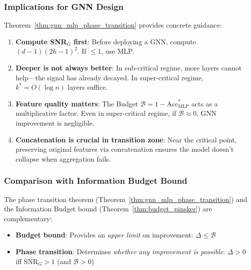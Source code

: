 \subsubsection{Implications for GNN Design}

\begin{remark}
\label{rem:practical_implications}
Theorem~\ref{thm:gnn_mlp_phase_transition} provides concrete guidance:
\begin{enumerate}
    \item \textbf{Compute SNR$_G$ first}: Before deploying a GNN, compute $(d-1)(2h-1)^2$. If $\leq 1$, use MLP.

    \item \textbf{Deeper is not always better}: In sub-critical regime, more layers cannot help---the signal has already decayed. In super-critical regime, $k^* = O(\log n)$ layers suffice.

    \item \textbf{Feature quality matters}: The Budget $\mathcal{B} = 1 - \mathrm{Acc}_{\mathrm{MLP}}^*$ acts as a multiplicative factor. Even in super-critical regime, if $\mathcal{B} \approx 0$, GNN improvement is negligible.

    \item \textbf{Concatenation is crucial in transition zone}: Near the critical point, preserving original features via concatenation ensures the model doesn't collapse when aggregation fails.
\end{enumerate}
\end{remark}

\subsubsection{Comparison with Information Budget Bound}

The phase transition theorem (Theorem~\ref{thm:gnn_mlp_phase_transition}) and the Information Budget bound (Theorem~\ref{thm:budget_pinsker}) are complementary:

\begin{itemize}
    \item \textbf{Budget bound}: Provides an \textit{upper limit} on improvement: $\Delta \leq \mathcal{B}$
    \item \textbf{Phase transition}: Determines \textit{whether any improvement is possible}: $\Delta > 0$ iff $\mathrm{SNR}_G > 1$ (and $\mathcal{B} > 0$)
\end{itemize}

